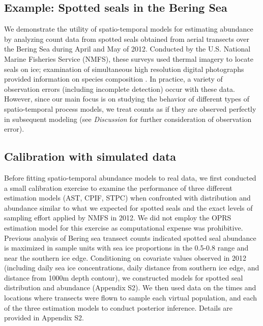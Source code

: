 \documentclass[12pt,english]{article}
\begin{document}
\begin{spacing}{1.9}
\section{Example: Spotted seals in the Bering Sea}

We demonstrate the utility of spatio-temporal models for estimating abundance by analyzing
count data from spotted seals obtained from aerial transects over the Bering Sea during April and May of 2012.  Conducted by the U.S. National Marine Fisheries Service (NMFS), these surveys used thermal imagery to locate seals on ice; examination of simultaneous high resolution digital photographs provided information on species composition \citep[for detailed information on survey methods, see][]{ConnEtAl2014}.  In practice, a variety of observation errors (including incomplete detection) occur with these data.  However, since our main focus is on studying the behavior of different types of spatio-temporal process models, we treat counts as if they are observed perfectly in subsequent modeling (see {\it Discussion} for further consideration of observation error).

\subsection{Calibration with simulated data}

Before fitting spatio-temporal abundance models to real data, we first conducted a small calibration exercise to examine the performance of three different estimation models (AST, CPIF, STPC) when confronted with distribution and abundance similar to what we expected for spotted seals and the exact levels of sampling effort applied by NMFS in 2012.  We did not employ the OPRS estimation model for this exercise as computational expense was prohibitive.  Previous analysis of Bering sea transect counts  \citep[e.g.,]{ConnEtAl2014,VerHoefEtAl2014} indicated spotted seal abundance is maximized in sample units with sea ice proportions in the 0.5-0.8 range and near the southern ice edge.  Conditioning on covariate values observed in 2012 (including daily sea ice concentrations, daily distance from southern ice edge, and distance from 1000m depth contour), we constructed models for spotted seal distribution and abundance (Appendix S2).  We then used data on the times and locations where transects were flown to sample each virtual population, and each of the three estimation models to conduct posterior inference.  Details are provided in Appendix S2.


\end{spacing}
\end{document}
